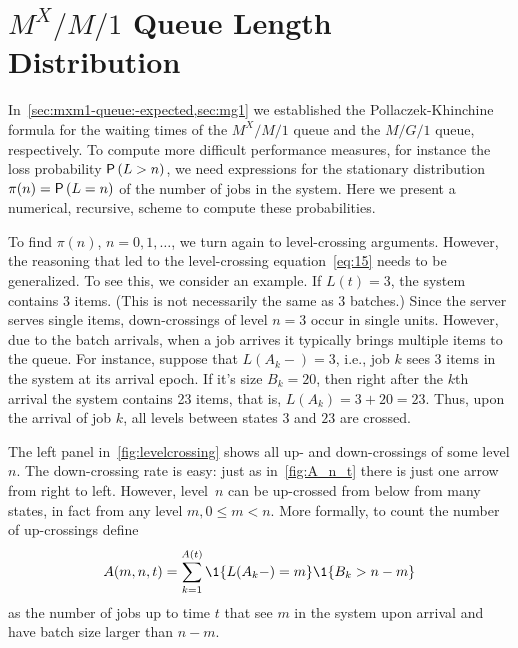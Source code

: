 \section{$M^X/M/1$ Queue Length Distribution}
\label{sec:batch-arrivals}





In~\cref{sec:mxm1-queue:-expected,sec:mg1} we established the Pollaczek-Khinchine formula for the waiting times of the $M^X/M/1$ queue and the $M/G/1$ queue, respectively.
To compute more difficult performance measures, for instance the loss probability $\P{L>n}$, we need expressions for the stationary distribution $\pi(n)=\P{L=n}$ of the number of jobs in the system.
Here we present a numerical, recursive, scheme to compute these probabilities.

To find $\pi(n)$, $n=0, 1, \ldots$, we turn again to level-crossing arguments.
However, the reasoning that led to the level-crossing equation~\cref{eq:15} needs to be generalized.
To see this, we consider an example.
If $L(t)=3$, the system contains $3$ items.
(This is not necessarily the same as 3 batches.)
Since the server serves single items, down-crossings of level $n=3$ occur in single units.
However, due to the batch arrivals, when a job arrives it typically brings multiple items to the queue.
For instance, suppose that $L(A_k-) = 3$, i.e., job $k$ sees 3 items in the system at its arrival epoch.
If it's size $B_k = 20$, then right after the $k$th arrival the system contains 23 items, that is, $L(A_k)=3+20=23$.
Thus, upon the arrival of job $k$, all levels between states $3$ and $23$ are crossed.

The left panel in~\cref{fig:levelcrossing} shows all up- and down-crossings of some level $n$.
The down-crossing rate is easy: just as in~\cref{fig:A_n_t} there is just one arrow from right to left.
However, level~$n$ can be up-crossed from below from many states, in fact from any level $m, 0\leq m <n$.
More formally, to count the number of up-crossings define
\begin{equation*}
 A(m,n,t) = \sum_{k=1}^{A(t)}\1{L(A_k-) = m}\1{B_k > n-m}
\end{equation*}
as the number of jobs up to time $t$ that see $m$ in the system upon arrival and have batch size larger than $n-m$.


